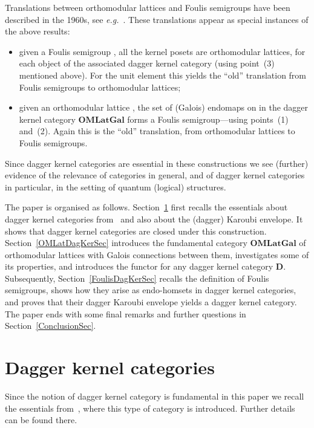 \documentclass{article}
\newcommand{\Cat}[1]{\ensuremath{\mathbf{#1}}}
\begin{document}
Translations between orthomodular lattices and Foulis semigroups have
been described in the 1960s, see
\textit{e.g.}~\cite{Foulis60,Foulis62,Foulis63,BlythJ72,Kalmbach83}. These
translations appear as special instances of the above results:
\begin{itemize}
\item given a Foulis semigroup , all the kernel posets 
  are orthomodular lattices, for each object  of
  the associated dagger kernel category (using point~(3) mentioned
  above). For the unit element  this yields the ``old''
  translation from Foulis semigroups to orthomodular lattices;

\item given an orthomodular lattice , the set of (Galois) endomaps
   on  in the dagger kernel
  category \Cat{OMLatGal} forms a Foulis semigroup---using points~(1)
  and~(2). Again this is the ``old'' translation, from orthomodular
  lattices to Foulis semigroups.
\end{itemize}

\noindent Since dagger kernel categories are essential in these
constructions we see (further) evidence of the relevance of categories
in general, and of dagger kernel categories in particular, in the
setting of quantum (logical) structures.

The paper is organised as follows. Section~\ref{DagKerSec} first
recalls the essentials about dagger kernel categories
from~\cite{HeunenJ09a} and also about the (dagger) Karoubi envelope.
It shows that dagger kernel categories are closed under this
construction. Section~\ref{OMLatDagKerSec} introduces the fundamental
category \Cat{OMLatGal} of orthomodular lattices with Galois
connections between them, investigates some of its properties, and
introduces the functor 
for any dagger kernel category \Cat{D}. Subsequently,
Section~\ref{FoulisDagKerSec} recalls the definition of Foulis semigroups,
shows how they arise as endo-homsets in dagger kernel categories,
and proves that their dagger Karoubi envelope yields a dagger
kernel category. The paper ends with some final remarks and further
questions in Section~\ref{ConclusionSec}.


\section{Dagger kernel categories}\label{DagKerSec}

Since the notion of dagger kernel category is fundamental in this
paper we recall the essentials from~\cite{HeunenJ09a}, where this type
of category is introduced. Further details can be found there.
\end{document}
